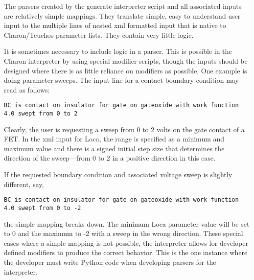 The parsers created by the generate interpreter script and all
associated inputs are relatively simple mappings.  They translate
simple, easy to understand user input to the multiple lines of nested
xml formatted input that is native to Charon/Teuchos parameter lists.
They contain very little logic.

It is sometimes necessary to include logic in a parser.  This is
possible in the Charon interpreter by using special modifier scripts,
though the inputs should be designed where there is as little reliance
on modifiers as possible.  One example is doing parameter sweeps.  The
input line for a contact boundary condition may read as follows:
\begin{lstlisting}
BC is contact on insulator for gate on gateoxide with work function 4.0 swept from 0 to 2
\end{lstlisting}
Clearly, the user is requesting a sweep from 0 to 2 volts on the gate
contact of a FET.  In the xml input for Loca, the range is specified
as a minimum and maximum value and there is a signed initial step size
that determines the direction of the sweep---from 0 to 2 in a positive
direction in this case.

If the requested boundary condition and associated voltage sweep is
slightly different, say,
\begin{lstlisting}
BC is contact on insulator for gate on gateoxide with work function 4.0 swept from 0 to -2
\end{lstlisting}
the simple mapping breaks down.  The minimum Loca parameter value will
be set to 0 and the maximum to -2 with a sweep in the wrong direction.
These special cases where a simple mapping is not possible, the
interpreter allows for developer-defined modifiers to produce the
correct behavior.  This is the one instance where the developer must
write Python code when developing parsers for the interpreter.


